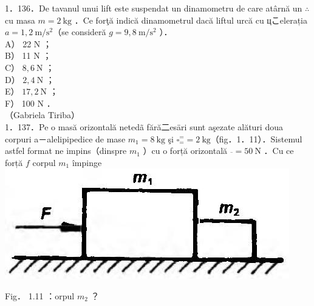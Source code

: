\documentclass[10pt]{article}
\begin{document}
1．136．De tavanul unui lift este suspendat un dinamometru de care atârnă un $\therefore$ cu masa $m=2 \mathrm{~kg}$ ．Ce forţă indică dinamometrul dacă liftul urcă cu цこelerația $a=1,2 \mathrm{~m} / \mathrm{s}^{2}$（se consideră $g=9,8 \mathrm{~m} / \mathrm{s}^{2}$ ）．\\
A） 22 N ；\\
B） 11 N ；\\
C） $8,6 \mathrm{~N}$ ；\\
D） $2,4 \mathrm{~N}$ ；\\
E） $17,2 \mathrm{~N}$ ；\\
F） 100 N ．\\
（Gabriela Tiriba）\\
1．137．Pe o masă orizontală netedã fără二esäri sunt aşezate alături doua corpuri a－alelipipedice de mase $m_{1}=8 \mathrm{~kg}$ şi $\square_{=}^{=}=2 \mathrm{~kg}$（fig．1．11）．Sistemul astfel format ne impins（dinspre $m_{1}$ ）cu o forță orizontală $\overline{ }=50 \mathrm{~N}$ ．Cu ce forță $f$ corpul $m_{1}$ împinge\\
\includegraphics[max width=\textwidth, center]{2025_07_01_5b3ff9fa0d508c8e9f17g-033}

Fig． 1.11 ：orpul $m_{2}$ ？
\end{document}
